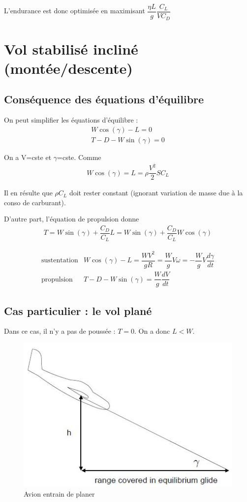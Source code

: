 \documentclass{report}
\begin{document}
L'endurance est donc optimisée en maximisant $\dfrac{\eta L}{g}\dfrac{C_L}{VC_D}$

\section{Vol stabilisé incliné (montée/descente)}
\subsection{Conséquence des équations d'équilibre}

On peut simplifier les équations d'équilibre :
\begin{eqnarray}
W \cos(\gamma)-L=0\\
T-D-W \sin(\gamma)=0
\end{eqnarray}

On a V=cste et $\gamma$=cste. Comme
\begin{eqnarray}
W \cos(\gamma)=L=\rho\dfrac{V^2}{2}SC_L
\end{eqnarray}

Il en résulte que $\rho C_L$ doit rester constant (ignorant variation de masse due à la conso de carburant).

D'autre part, l'équation de propulsion donne
\begin{eqnarray}
T=W \sin(\gamma)+\dfrac{C_D}{C_L}L=W \sin(\gamma)+\dfrac{C_D}{C_L}W\cos(\gamma)
\end{eqnarray}

\begin{eqnarray}
\text{sustentation} & W\cos(\gamma)-L=\dfrac{W V^2}{gR}=\dfrac{W}{g}V\omega = -\dfrac{W}{g}V\dfrac{d\gamma}{dt}\\
\text{propulsion} & T-D-W \sin(\gamma) = \dfrac{W}{g}\dfrac{dV}{dt}
\end{eqnarray}

\subsection{Cas particulier : le vol plané}

Dans ce cas, il n'y a pas de poussée : $T=0$. On a donc $L<W$.

\begin{figure}[h!]
    \centering
    \includegraphics[scale=0.7]{12.JPG}
    \caption{Avion entrain de planer}
    \label{12}
\end{figure}
\end{document}
